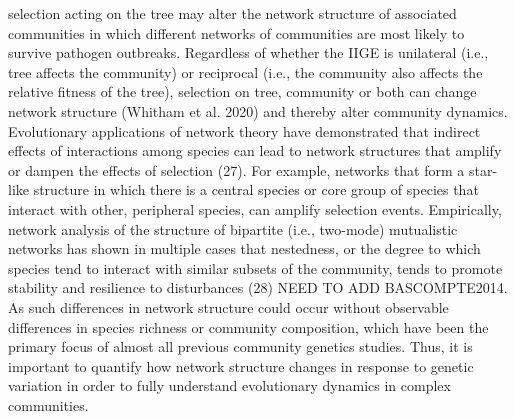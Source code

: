 \documentclass{article}
\begin{document}
selection acting on the tree may alter the network structure of associated communities in which different networks of
communities are most likely to survive pathogen outbreaks. Regardless of whether the IIGE is unilateral (i.e., tree
affects the community) or reciprocal (i.e., the community also affects the relative fitness of the tree), selection on
tree, community or both can change network structure (Whitham et al. 2020) and thereby alter community dynamics.
Evolutionary applications of network theory have demonstrated that indirect effects of interactions among species can
lead to network structures %
%
%
that amplify or dampen the effects of selection (27). For example, networks that form a star-like structure in which
there is a central species or core group of species that interact with other, peripheral species, can amplify selection
events. Empirically, network analysis of the structure of bipartite (i.e., two-mode) mutualistic networks has shown in
multiple cases that nestedness, or the degree to which species tend to interact with similar subsets of the community,
tends to promote stability and resilience to disturbances (28) NEED TO ADD %
BASCOMPTE2014. As such differences in network structure could occur without observable differences in species richness
or community composition, which have been the primary focus of almost all previous community genetics studies. Thus, it
is important to quantify how network structure changes in response to genetic variation in order to fully understand
evolutionary dynamics in complex communities. 
\end{document}
